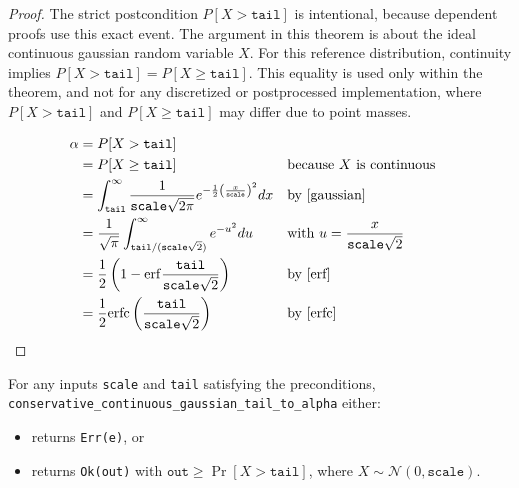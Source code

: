 \documentclass{article}
\begin{document}
\begin{proof}
    The strict postcondition $P[X > \texttt{tail}]$ is intentional, because dependent proofs use this exact event.
    The argument in this theorem is about the ideal continuous gaussian random variable $X$.
    For this reference distribution, continuity implies $P[X > \texttt{tail}] = P[X \ge \texttt{tail}]$.
    This equality is used only within the theorem, and not for any discretized or postprocessed implementation,
    where $P[X > \texttt{tail}]$ and $P[X \ge \texttt{tail}]$ may differ due to point masses.

    \begin{align*}
        \alpha &= P[X > \texttt{tail}] \\
        &= P[X \ge \texttt{tail}] && \text{because } X \text{ is continuous} \\
        &= \int_{\texttt{tail}}^{\infty} \frac{1}{\texttt{scale} \sqrt{2 \pi}} e^{-\frac{1}{2}\left( \frac{x}{\texttt{scale}}\right)^2} dx && \text{by } \ref{gaussian} \\
        &= \frac{1}{\sqrt{\pi}} \int_{\texttt{tail} / (\texttt{scale} \sqrt{2})}^{\infty} e^{-u^2} du && \text{with } u = \frac{x}{\texttt{scale} \sqrt{2}} \\
        &= \frac{1}{2} \left(1 - \mathrm{erf}\frac{\texttt{tail}}{\texttt{scale} \sqrt{2}}\right) && \text{by } \ref{erf} \\
        &= \frac{1}{2} \mathrm{erfc}\left(\frac{\texttt{tail}}{\texttt{scale} \sqrt{2}}\right) && \text{by } \ref{erfc}
    \end{align*}
\end{proof}

\begin{theorem}\label{thm:postcondition}
    For any inputs \texttt{scale} and \texttt{tail} satisfying the preconditions, \\
    \texttt{conservative\_continuous\_gaussian\_tail\_to\_alpha} either:
    \begin{itemize}
        \item returns \texttt{Err(e)}, or
        \item returns \texttt{Ok(out)} with $\texttt{out} \ge \Pr[X > \texttt{tail}]$, where $X \sim \mathcal{N}(0, \texttt{scale})$.
    \end{itemize}
\end{theorem}
\end{document}
